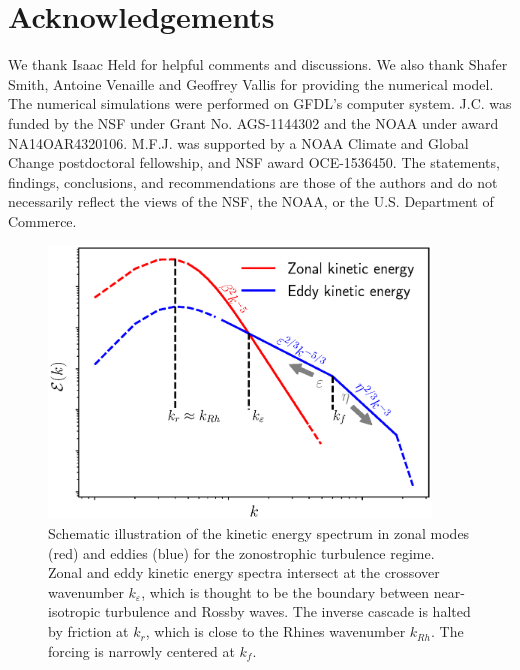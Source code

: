 \documentclass{jfm}
\begin{document}
\section*{Acknowledgements}

We thank Isaac Held for helpful comments and discussions. We also thank
Shafer Smith, Antoine Venaille and Geoffrey Vallis for providing the 
numerical model.  The numerical simulations were
performed on GFDL’s computer system. J.C. was
funded by the NSF under Grant No. AGS-1144302 and the
NOAA under award NA14OAR4320106.  M.F.J. was supported by a NOAA Climate and Global Change
postdoctoral fellowship, and NSF award OCE-1536450. The statements, findings, conclusions, and recommendations are
those of the authors and do not necessarily reflect the
views of the NSF, the NOAA, or the U.S. Department
of Commerce.




\begin{figure}
\begin{center}
\includegraphics[width=4in]{EKE_ZKE_spectra_illustrate}\caption{Schematic illustration of the kinetic energy spectrum in zonal modes (red) and eddies (blue) for the zonostrophic turbulence regime. Zonal
and eddy kinetic energy spectra intersect at the crossover wavenumber $k_{\varepsilon}$,
which is thought to be the boundary between near-isotropic turbulence and Rossby
waves. The inverse cascade is halted by friction at $k_{r}$, which is
close to the Rhines wavenumber $k_{Rh}$. The forcing is narrowly
centered at $k_{f}$.}
\label{EKE_KE_spectra_illustrate}
\end{center}
\end{figure}
\end{document}
